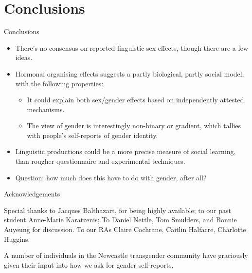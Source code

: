 \documentclass[hyperref={pdfpagelabels=false}]{beamer}
\begin{document}



\section{Conclusions}


\begin{frame}{Conclusions}
		\begin{itemize}
			\item There's no consensus on reported linguistic sex effects, though there are a few ideas.
			\item Hormonal organising effects suggests a partly biological, partly social model, with the following properties:
		\begin{itemize}
			\item It could explain both sex/gender effects based on independently attested mechanisms.
			\item The view of gender is interestingly non-binary or gradient, which tallies with people's self-reports of gender identity.
			\end{itemize}
			\item Linguistic productions could be a more precise measure of social learning, than rougher questionnaire and experimental techniques.
			\item Question: how much does this have to do with gender, after all?
	\end{itemize}
\end{frame}




\begin{frame}{Acknowledgements}
\begin{center}

Special thanks to Jacques Balthazart, for being highly available; to our past student Anne-Marie Karatzenis; To Daniel Nettle, Tom Smulders, and Bonnie Auyeung for discussion. To our RAs Claire Cochrane, Caitlin Halfacre, Charlotte Huggins.

A number of individuals in the Newcastle transgender community have graciously given their input into how we ask for gender self-reports.

\end{center}
\end{frame}
\end{document}
